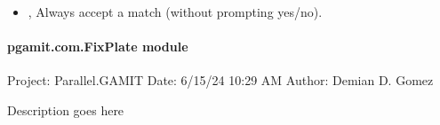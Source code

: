 \documentclass[letterpaper,10pt,english]{sphinxmanual}
\begin{document}
\begin{itemize}
\item {} 
\sphinxAtStartPar
{\hyperref[\detokenize{pgamit.com:DownloadSourcesFill.py--yes}]{}}, {\hyperref[\detokenize{pgamit.com:DownloadSourcesFill.py---force_yes}]{}} \sphinxhyphen{} Always accept a match (without prompting yes/no).

\end{itemize}


\paragraph{pgamit.com.FixPlate module}
\label{\detokenize{pgamit.com:module-pgamit.com.FixPlate}}\label{\detokenize{pgamit.com:pgamit-com-fixplate-module}}
\sphinxAtStartPar
Project: Parallel.GAMIT
Date: 6/15/24 10:29 AM
Author: Demian D. Gomez

\sphinxAtStartPar
Description goes here

\begin{fulllineitems}
\label{\detokenize{pgamit.com:pgamit.com.FixPlate.build_design}}
\pysigstartsignatures
\pysiglinewithargsret
{}
{\sphinxparamcomma {}}
{}
\pysigstopsignatures
\end{fulllineitems}


\begin{fulllineitems}
\label{\detokenize{pgamit.com:pgamit.com.FixPlate.build_design_href}}
\pysigstartsignatures
\pysiglinewithargsret
{}
{}
{}
\pysigstopsignatures
\end{fulllineitems}

\end{document}
